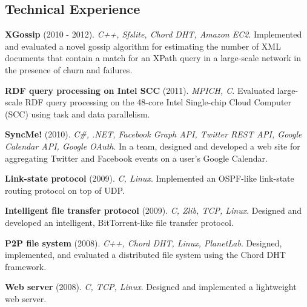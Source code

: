\documentclass[margin,line]{resume}
\begin{document}
\begin{resume}
    \section{\mysidestyle Technical Experience}
    

    \textbf{XGossip} (2010 - 2012). \textsl{C++, Sfslite, Chord DHT, Amazon EC2}. Implemented and evaluated a novel gossip algorithm for estimating the number of XML documents that contain a match for an XPath query in a large-scale network in the presence of churn and failures.

\vspace{-2mm}
    \textbf{RDF query processing on Intel SCC} (2011). \textsl{MPICH, C}. Evaluated large-scale RDF query processing on the 48-core Intel Single-chip Cloud Computer (SCC) using task and data parallelism.
    
\vspace{-2mm}
    \textbf{SyncMe!} (2010). \textsl{C\#, .NET, Facebook Graph API, Twitter REST API, Google Calendar API, Google OAuth}. In a team, designed and developed a web site for aggregating Twitter and Facebook events on a user's Google Calendar.

\vspace{-2mm}
    \textbf{Link-state protocol} (2009). \textsl{C, Linux}. Implemented an OSPF-like link-state routing protocol on top of UDP.

\vspace{-2mm}
    \textbf{Intelligent file transfer protocol} (2009). \textsl{C, Zlib, TCP, Linux}. Designed and developed an intelligent, BitTorrent-like file transfer protocol.

\vspace{-2mm}
    \textbf{P2P file system} (2008). \textsl{C++, Chord DHT, Linux, PlanetLab}. Designed, implemented, and evaluated a distributed file system using the Chord DHT framework.

\vspace{-2mm}
    \textbf{Web server} (2008). \textsl{C, TCP, Linux}. Designed and implemented a lightweight web server.
    

\end{resume}
\end{document}
